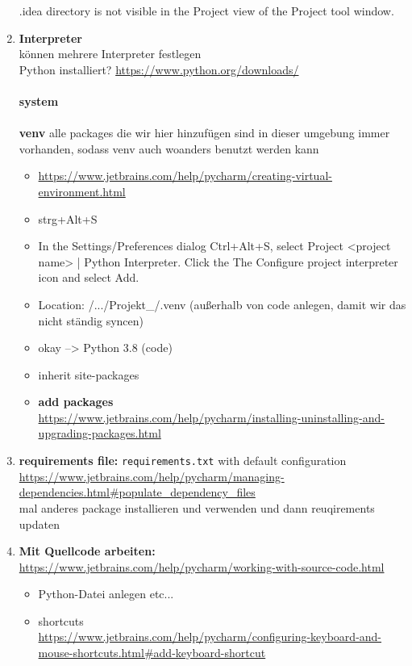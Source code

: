 \begin{enumerate}
	.idea directory is not visible in the Project view of the Project tool window.
	\item \textbf{Interpreter}\\
	können mehrere Interpreter festlegen\\
	Python installiert? \url{https://www.python.org/downloads/}~\\~\\
	\textbf{system}\\~\\
	\textbf{venv}
	alle packages die wir hier hinzufügen sind in dieser umgebung immer vorhanden, sodass venv auch woanders benutzt werden kann
	\begin{itemize}
		\item \url{https://www.jetbrains.com/help/pycharm/creating-virtual-environment.html}
		\item strg+Alt+S
		\item In the Settings/Preferences dialog Ctrl+Alt+S, select Project <project name> | Python Interpreter. Click the The Configure project interpreter icon and select Add.
		\item Location: /.../Projekt\_/.venv  (außerhalb von code anlegen, damit wir das nicht ständig syncen)
		\item okay --> Python 3.8 (code)
		\item inherit site-packages
		\item \textbf{add packages}\\
		\url{https://www.jetbrains.com/help/pycharm/installing-uninstalling-and-upgrading-packages.html}\\
	\end{itemize}
	\item \textbf{requirements file:} \texttt{requirements.txt} with default configuration\\
	\url{https://www.jetbrains.com/help/pycharm/managing-dependencies.html#populate_dependency_files}\\
	mal anderes package installieren und verwenden und dann reuqirements updaten
	\item \textbf{Mit Quellcode arbeiten:}\\ \url{https://www.jetbrains.com/help/pycharm/working-with-source-code.html}\\
	\begin{itemize}
		\item Python-Datei anlegen etc...
		\item shortcuts \\
		\url{https://www.jetbrains.com/help/pycharm/configuring-keyboard-and-mouse-shortcuts.html#add-keyboard-shortcut}

\end{itemize}
\end{enumerate}
